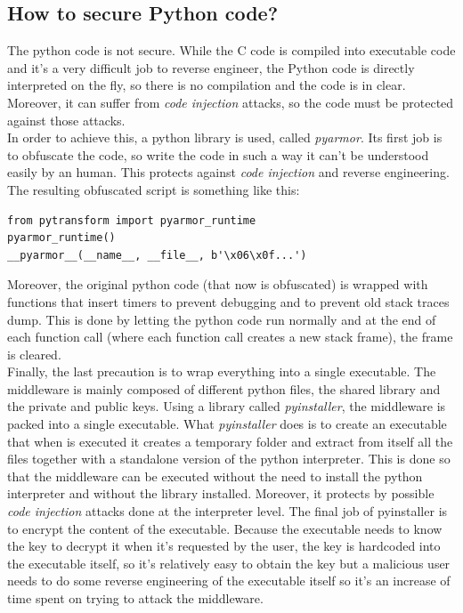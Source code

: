 \subsection{How to secure Python code?}
The python code is not secure. While the C code is compiled into executable code and it's a very difficult job to reverse engineer, the Python code is directly interpreted on the fly, so there is no compilation and the code is in clear. Moreover, it can suffer from \textit{code injection} attacks, so the code must be protected against those attacks.\\

In order to achieve this, a python library is used, called \textit{pyarmor}. Its first job is to obfuscate the code, so write the code in such a way it can't be understood easily by an human. This protects against \textit{code injection} and reverse engineering. The resulting obfuscated script is something like this:

\begin{lstlisting}[style=PyStyle]
from pytransform import pyarmor_runtime
pyarmor_runtime()
__pyarmor__(__name__, __file__, b'\x06\x0f...')
\end{lstlisting}

Moreover, the original python code (that now is obfuscated) is wrapped with functions that insert timers to prevent debugging and to prevent old stack traces dump. This is done by letting the python code run normally and at the end of each function call (where each function call creates a new stack frame), the frame is cleared. \\

Finally, the last precaution is to wrap everything into a single executable. The middleware is mainly composed of different python files, the shared library and the private and public keys. Using a library called \textit{pyinstaller}, the middleware is packed into a single executable. What \textit{pyinstaller} does is to create an executable that when is executed it creates a temporary folder and extract from itself all the files together with a standalone version of the python interpreter. This is done so that the middleware can be executed without the need to install the python interpreter and without the library installed. Moreover, it protects by possible \textit{code injection} attacks done at the interpreter level. The final job of pyinstaller is to encrypt the content of the executable. Because the executable needs to know the key to decrypt it when it's requested by the user, the key is hardcoded into the executable itself, so it's relatively easy to obtain the key but a malicious user needs to do some reverse engineering of the executable itself so it's an increase of time spent on trying to attack the middleware. 

